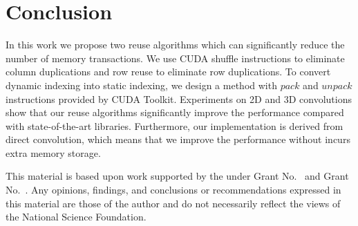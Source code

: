 \documentclass[sigplan,review,anonymous]{acmart}\settopmatter{printfolios=true,printccs=false,printacmref=false}
\begin{document}

\section{Conclusion}
In this work we propose two reuse algorithms which can significantly reduce the number of memory transactions. We use CUDA shuffle instructions to eliminate column duplications and row reuse to eliminate row duplications. To convert dynamic indexing into static indexing, we design a method with $pack$ and $unpack$ instructions provided by CUDA Toolkit. Experiments on 2D and 3D convolutions show that our reuse algorithms significantly improve the performance compared with state-of-the-art libraries. Furthermore, our implementation is derived from direct convolution, which means that we improve the performance without incurs extra memory storage.
\begin{acks}                            %
  This material is based upon work supported by the
   under Grant
  No.~ and Grant
  No.~.  Any opinions, findings, and
  conclusions or recommendations expressed in this material are those
  of the author and do not necessarily reflect the views of the
  National Science Foundation.
\end{acks}



\end{document}
